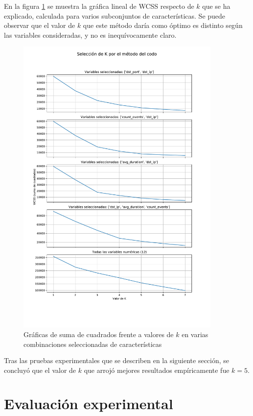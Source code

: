 En la figura \ref{fig:codo} se muestra la gráfica lineal de WCSS respecto de $k$ que se ha explicado, calculada para varios subconjuntos de características.
Se puede observar que el valor de $k$ que este método daría como óptimo es distinto según las variables consideradas, y no es inequívocamente claro.

\begin{figure}[h!]
    \centering
    \captionsetup{width=0.75\textwidth}
    \includegraphics[width=0.9\textwidth]{contenido/fig/codo.pdf}
    \caption{Gráficas de suma de cuadrados frente a valores de $k$ en varias combinaciones seleccionadas de características}
    \label{fig:codo}
\end{figure}

Tras las pruebas experimentales que se describen en la siguiente sección, se concluyó que el valor de $k$ que arrojó mejores resultados empíricamente fue $k=5$.

\section{Evaluación experimental}\label{sec:evaluacionexperimental}

